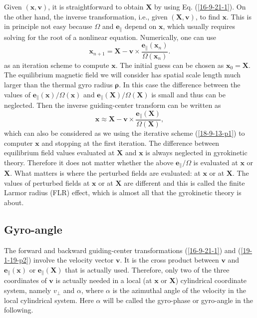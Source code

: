 \documentclass{article}
\newcommand{\tmmathbf}[1]{\ensuremath{\boldsymbol{#1}}}
\begin{document}
Given $(\mathbf{x}, \mathbf{v})$, it is straightforward to obtain $\mathbf{X}$
by using Eq. (\ref{16-9-21-1}). On the other hand, the inverse transformation,
i.e., given $(\mathbf{X}, \mathbf{v})$, to find $\mathbf{x}$. This is in
principle not easy because $\Omega$ and $\mathbf{e}_{\parallel}$ depend on
$\mathbf{x}$, which usually requires solving for the root of a nonlinear
equation. Numerically, one can use
\begin{equation}
  \label{18-9-13-p1} \mathbf{x}_{n + 1} =\mathbf{X}-\mathbf{v} \times
  \frac{\tmmathbf{e}_{\parallel} (\mathbf{x}_n)}{\Omega (\mathbf{x}_n)} .
\end{equation}
as an iteration scheme to compute $\mathbf{x}$. The initial guess can be
chosen as $\mathbf{x}_0 =\mathbf{X}$. The equilibrium magnetic field we will
consider has spatial scale length much larger than the thermal gyro radius
$\tmmathbf{\rho}$. In this case the difference between the values of
$\mathbf{e}_{\parallel} (\mathbf{x}) / \Omega (\mathbf{x})$ and
$\mathbf{e}_{\parallel} (\mathbf{X}) / \Omega (\mathbf{X})$ is small and thus
can be neglected. Then the inverse guiding-center transform can be written as
\begin{equation}
  \label{19-1-19-p2} \mathbf{x} \approx \mathbf{X}-\mathbf{v} \times
  \frac{\tmmathbf{e}_{\parallel} (\mathbf{X})}{\Omega (\mathbf{X})},
\end{equation}
which can also be considered as we using the iterative scheme
(\ref{18-9-13-p1}) to computer $\mathbf{x}$ and stopping at the first
iteration. The difference between equilibrium field values evaluated at
$\mathbf{X}$ and $\mathbf{x}$ is always neglected in gyrokinetic theory.
Therefore it does not matter whether the above $\mathbf{e}_{\parallel} /
\Omega$ is evaluated at $\mathbf{x}$ or $\mathbf{X}$. What matters is where
the perturbed fields are evaluated: at $\mathbf{x}$ or at $\mathbf{X}$. The
values of perturbed fields at $\mathbf{x}$ or at $\mathbf{X}$ are different
and this is called the finite Larmor radius (FLR) effect, which is almost all
that the gyrokinetic theory is about.

\subsection{Gyro-angle}

The forward and backward guiding-center transformations (\ref{16-9-21-1}) and
(\ref{19-1-19-p2}) involve the velocity vector $\mathbf{v}$. It is the cross
product between $\mathbf{v}$ and $\tmmathbf{e}_{\parallel} (\mathbf{x})$ or
$\tmmathbf{e}_{\parallel} (\mathbf{X})$ that is actually used. Therefore, only
two of the three coordinates of $\mathbf{v}$ is actually needed in a local (at
$\mathbf{x}$ or $\mathbf{X}$) cylindrical coordinate system, namely
$v_{\perp}$ and $\alpha$, where $\alpha$ is the azimuthal angle of the
velocity in the local cylindrical system. Here $\alpha$ will be called the
gyro-phase or gyro-angle in the following.
\end{document}
